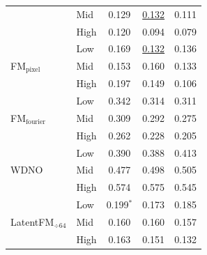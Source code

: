 \begin{table}[ht]
{\begin{tabular}{llccc}
 & Mid & 0.129 & \underline{0.132} & 0.111 \\
 & High & 0.120 & 0.094 & 0.079 \\
\midrule
\multirow{3}{*}{FM$_\text{pixel}$} & Low & 0.169 & \underline{0.132} & 0.136 \\
 & Mid & 0.153 & 0.160 & 0.133 \\
 & High & 0.197 & 0.149 & 0.106 \\
\midrule
\multirow{3}{*}{FM$_\text{fourier}$} & Low & 0.342 & 0.314 & 0.311 \\
 & Mid & 0.309 & 0.292 & 0.275 \\
 & High & 0.262 & 0.228 & 0.205 \\
\midrule
\multirow{3}{*}{WDNO} & Low & 0.390 & 0.388 & 0.413 \\
 & Mid & 0.477 & 0.498 & 0.505 \\
 & High & 0.574 & 0.575 & 0.545 \\
\midrule
\multirow{3}{*}{LatentFM$_{\div 64}$} & Low & 0.199$^{*}$ & 0.173 & 0.185 \\
 & Mid & 0.160 & 0.160 & 0.157 \\
 & High & 0.163 & 0.151 & 0.132 \\
\bottomrule
\end{tabular}
}
\end{table}
